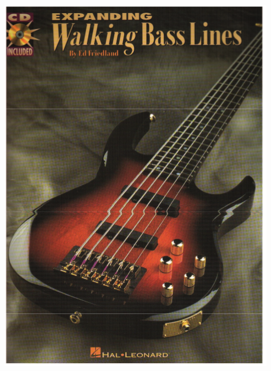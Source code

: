 \documentclass[a4paper]{book}
\begin{document}
\begin{center}
\includegraphics[width=11.693cm,height=16.111cm]{lebluessupportsmethodes-img158.png}
\end{center}
\end{document}
